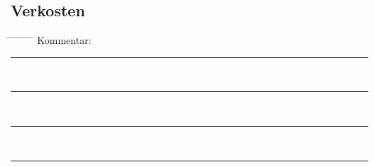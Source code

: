 \documentclass[12pt,oneside,a4paper]{scrartcl}
\begin{document}
{\subsection*{Verkosten}
\begin{tabbing}
	\hspace{1cm} \= \hspace{1cm} \= \hspace{1cm} \= \hspace{1cm} \= \hspace{1cm} \= \hspace{1cm} \= \hspace{1cm} \= \hspace{1cm} \= \kill
	\> Kommentar: \>\>\> \\
	\> \>  \rule[-0.2cm]{15.3cm}{1pt}\\
	\> \>  \rule[-0.2cm]{15.3cm}{1pt}\\
	\> \>  \rule[-0.2cm]{15.3cm}{1pt}\\		
	\> \>  \rule[-0.2cm]{15.3cm}{1pt}
\end{tabbing}}
\end{document}
